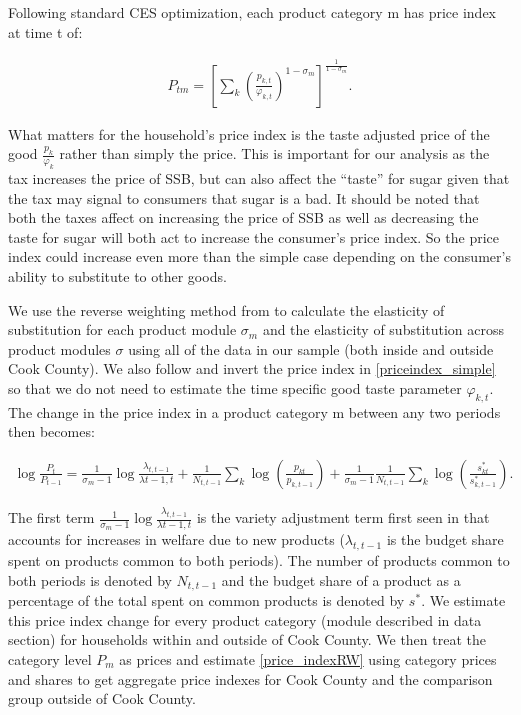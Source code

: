 \documentclass[12pt]{article}
\begin{document}
Following standard CES optimization, each product category m has price index at time t of:

\begin{align}
P_{tm} = \left[ \sum_k \left( \frac{p_{k,t}}{\varphi_{k,t}}\right)^{1-\sigma_m}\right]^{\frac{1}{1-\sigma_m}}. \label{priceindex_simple}
\end{align}

What matters for the household's price index is the taste adjusted price of the good $\frac{p_k}{\varphi_k}$ rather than simply the price. This is important for our analysis as the tax increases the price of SSB, but can also affect the ``taste'' for sugar given that the tax may signal to consumers that sugar is a bad. It should be noted that both the taxes affect on increasing the price of SSB as well as decreasing the taste for sugar will both act to increase the consumer's price index. So the price index could increase even more than the simple case depending on the consumer's ability to substitute to other goods.

We use the reverse weighting method from \textcite{redding2020measuring} to calculate the elasticity of substitution for each product module $\sigma_m$ and the elasticity of substitution across product modules $\sigma$ using all of the data in our sample (both inside and outside Cook County). We also follow \textcite{redding2020measuring} and invert the price index in \eqref{priceindex_simple} so that we do not need to estimate the time specific good taste parameter $\varphi_{k,t}$. The change in the price index in a product category m between any two periods then becomes:

\begin{align}
\log \frac{P_t}{P_{t-1}} = \frac{1}{\sigma_m-1} \log \frac{\lambda_{t,t-1}}{\lambda{t-1,t}} + \frac{1}{N_{t,t-1}} \sum_k \log \left(\frac{p_{kt}}{p_{k,t-1}}\right) + \frac{1}{\sigma_m -1}\frac{1}{N_{t,t-1}} \sum_k \log\left(\frac{s^*_{kt}}{s^*_{k,t-1}} \right) \label{price_indexRW} .
\end{align}

The first term $\frac{1}{\sigma_m-1} \log \frac{\lambda_{t,t-1}}{\lambda{t-1,t}}$ is the variety adjustment term first seen in \textcite{feenstra1994new} that accounts for increases in welfare due to new products ($\lambda_{t,t-1}$ is the budget share spent on products common to both periods). The number of products common to both periods is denoted by $N_{t,t-1}$ and the budget share of a product as a percentage of the total spent on common products is denoted by $s^*$. We estimate this price index change for every product category (module described in data section) for households within and outside of Cook County. We then treat the category level $P_m$ as prices and estimate \eqref{price_indexRW} using category prices and shares to get aggregate price indexes for Cook County and the comparison group outside of Cook County.
\end{document}
